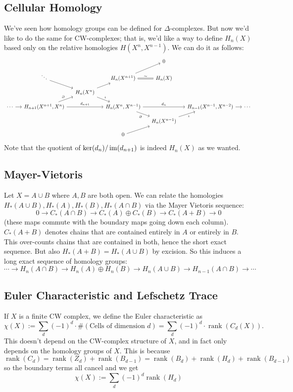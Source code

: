 \documentclass{amsart}
\DeclareMathOperator{\rank}{rank}
\begin{document}
	 \subsection{Cellular Homology} We've seen how homology groups can be defined for $\Delta$-complexes. But now we'd like to do the same for CW-complexes; that is, we'd like a way to define $H_n(X)$ based only on the relative homologies $H(X^n,X^{n-1})$. We can do it as follows:
	 $$
	 \begin{tikzcd}[sep=small]
	 	&&&& 0 \\
	 	& \ddots && {H_n(X^{n+1})} & {H_n(X)} \\
	 	&& {H_n(X^n)} \\
	 	\cdots & {H_{n+1}(X^{n+1},X^n)} && {H_n(X^n,X^{n-1})} && {H_{n-1}(X^{n-1},X^{n-2})} & \cdots \\
	 	&&&& {H_n(X^{n-1})} \\
	 	&&& 0
	 	\arrow[from=2-2, to=3-3]
	 	\arrow[from=2-4, to=1-5]
	 	\arrow["\sim", equals, from=2-4, to=2-5]
	 	\arrow[from=3-3, to=2-4]
	 	\arrow["\iota", from=3-3, to=4-4]
	 	\arrow[from=4-1, to=4-2]
	 	\arrow["\partial", from=4-2, to=3-3]
	 	\arrow["{d_{n+1}}", from=4-2, to=4-4]
	 	\arrow["{d_n}", from=4-4, to=4-6]
	 	\arrow["\partial"', from=4-4, to=5-5]
	 	\arrow[from=4-6, to=4-7]
	 	\arrow["\iota"', from=5-5, to=4-6]
	 	\arrow[from=6-4, to=5-5]
	 \end{tikzcd}
	 $$
	 Note that the quotient of $\ker(d_n)/\operatorname{im}(d_{n+1})$ is indeed $H_n(X)$ as we wanted.\\
	 
	\subsection{Mayer-Vietoris} Let $X=A\cup B$ where $A,B$ are both open. We can relate the homologies $H_*(A\cup B),H_*(A),H_*(B),H_*(A\cap B)$ via the Mayer Vietoris sequence:
	$$
	0 \to C_*(A\cap B) \to C_*(A)\oplus C_*(B) \to C_*(A+B)\to 0
	$$
	(these maps commute with the boundary maps going down each column). $C_*(A+B)$ denotes chains that are contained entirely in $A$ or entirely in $B$. This over-counts chains that are contained in both, hence the short exact sequence. But also $H_*(A+B) = H_*(A\cup B)$ by excision. So this induces a long exact sequence of homology groups:
	$$
	\cdots \to H_n(A\cap B) \to H_n(A)\oplus H_n(B) \to H_n(A\cup B) \to H_{n-1}(A\cap B) \to \cdots 
	$$
	
	\medspace
	
	\subsection{Euler Characteristic and Lefschetz Trace} If $X$ is a finite CW complex, we define the Euler characteristic as 
	$$
	\chi(X) := \sum_d (-1)^d \cdot \#(\text{Cells of dimension $d$}) = \sum_d (-1)^d \cdot \rank(C_d(X)).
	$$
	This doesn't depend on the CW-complex structure of $X$, and in fact only depends on the homology groups of $X$. This is because 
	$$
	\rank(C_d) = \rank(Z_d) + \rank(B_{d-1}) = \rank(B_d) + \rank(H_d) + \rank(B_{d-1})
	$$
	so the boundary terms all cancel and we get
	$$
	\chi(X) := \sum_d (-1)^d \rank(H_d)
	$$
	
\end{document}
